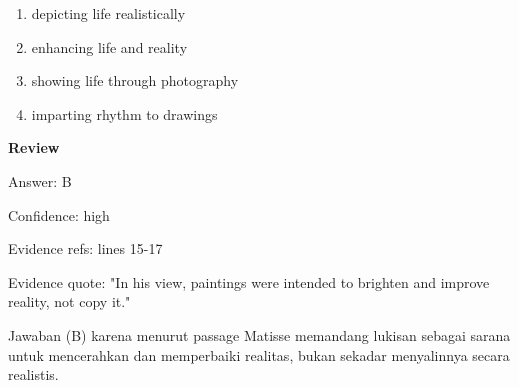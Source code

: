 \documentclass[12pt]{article}
\begin{document}
\begin{enumerate}[label=(\Alph*),leftmargin=*,itemsep=0.2em]
\item depicting life realistically
\item enhancing life and reality
\item showing life through photography
\item imparting rhythm to drawings
\end{enumerate}
\par
\begingroup
\setlength{\parskip}{0pt}
\setlength{\parindent}{0pt}
\textbf{Review}\par
Answer: B\par
Confidence: high\par
Evidence refs: lines 15-17\par
Evidence quote: "In his view, paintings were intended to brighten and improve reality, not copy it."\par
Jawaban (B) karena menurut passage Matisse memandang lukisan sebagai sarana untuk mencerahkan dan memperbaiki realitas, bukan sekadar menyalinnya secara realistis.\par
\endgroup
\par
\vspace{0.25\baselineskip}
\end{document}
